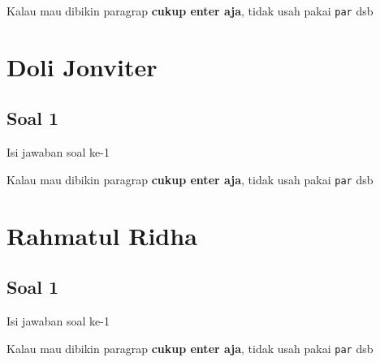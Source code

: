 Kalau mau dibikin paragrap \textbf{cukup enter aja}, tidak usah pakai \verb|par| dsb



\section{Doli Jonviter}
\subsection{Soal 1}
Isi jawaban soal ke-1

Kalau mau dibikin paragrap \textbf{cukup enter aja}, tidak usah pakai \verb|par| dsb



\section{Rahmatul Ridha}
\subsection{Soal 1}
Isi jawaban soal ke-1

Kalau mau dibikin paragrap \textbf{cukup enter aja}, tidak usah pakai \verb|par| dsb



